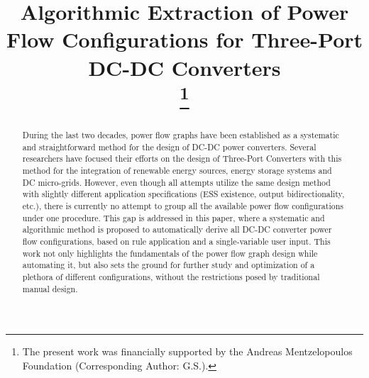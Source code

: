 \documentclass[conference]{IEEEtran}
\begin{document}
\title{Algorithmic Extraction of Power Flow Configurations for Three-Port DC-DC Converters\\

\thanks{The present work was financially supported by the Andreas
Mentzelopoulos Foundation (Corresponding Author: G.S.).}
}

\author{
\and
{}
}

\maketitle

\begin{abstract}
During the last two decades, power flow graphs have been established as a systematic and straightforward method for the design of DC-DC power converters. Several researchers have focused their efforts on the design of Three-Port Converters with this method for the integration of renewable energy sources, energy storage systems and DC micro-grids. However, even though all attempts utilize the same design method with slightly different application specifications (ESS existence, output bidirectionality, etc.), there is currently no attempt to group all the available power flow configurations under one procedure. This gap is addressed in this paper, where a systematic and algorithmic method is proposed to automatically derive all DC-DC converter power flow configurations, based on rule application and a single-variable user input. This work not only highlights the fundamentals of the power flow graph design while automating it, but also sets the ground for further study and optimization of a plethora of different configurations, without the restrictions posed by traditional manual design.
\end{abstract}
\end{document}
